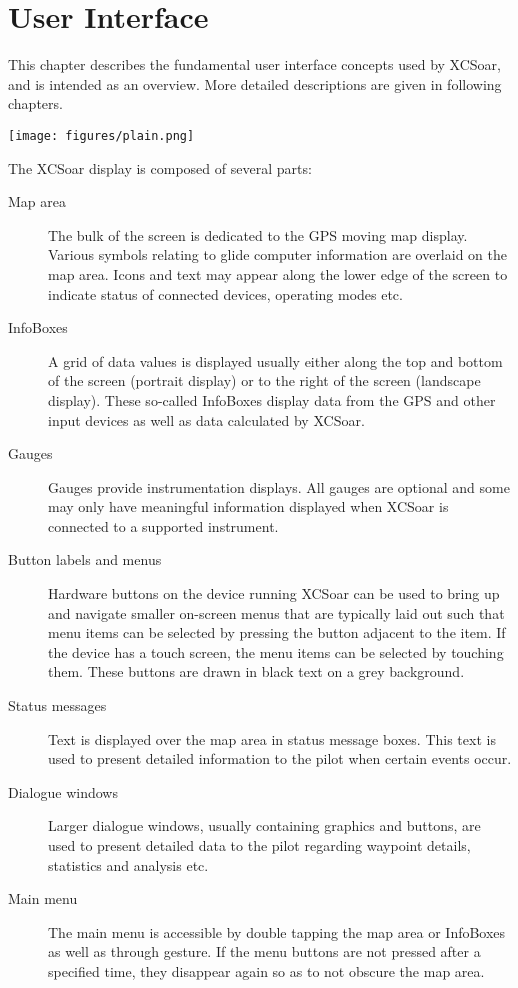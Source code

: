 \chapter{User Interface}\label{cha:interface}
This chapter describes the fundamental user interface concepts used by
XCSoar, and is intended as an overview.  More detailed descriptions
are given in following chapters.

\begin{center}
\texttt{[image: figures/plain.png]}
\end{center}

The XCSoar display is composed of several parts:
\begin{description}
\item[Map area] The bulk of the screen is dedicated to the GPS moving map
display. Various symbols relating to glide computer information are overlaid
on the map area. Icons and text may appear along the lower edge of the screen
to indicate status of connected devices, operating modes etc.
\item[InfoBoxes] A grid of data values is displayed usually either along
the top and bottom of the screen (portrait display) or to the right of the
screen (landscape display).  These so-called InfoBoxes display data from the
GPS and other input devices as well as data calculated by XCSoar.
\item[Gauges]  Gauges provide instrumentation displays. All gauges are optional
and some may only have meaningful information displayed when XCSoar is
connected to a supported instrument.
\item[Button labels and menus] Hardware buttons on the device running XCSoar
can be used to bring up and navigate smaller on-screen menus that are
typically laid out such that menu items can be selected by pressing the
button adjacent to the item.  If the device has a touch screen, the menu
items can be selected by touching them.  These buttons are drawn in black
text on a grey background.
\item[Status messages] Text is displayed over the map area in status message
boxes.  This text is used to present detailed information to the pilot when
certain events occur.
\item[Dialogue windows] Larger dialogue windows, usually containing graphics and
buttons, are used to present detailed data to the pilot regarding waypoint
details, statistics and analysis etc.
\item[Main menu] The main menu is accessible by double tapping the map area or
InfoBoxes as well as through gesture. If the menu buttons are
not pressed after a specified time, they disappear again so as to not obscure the map area.
\end{description}

